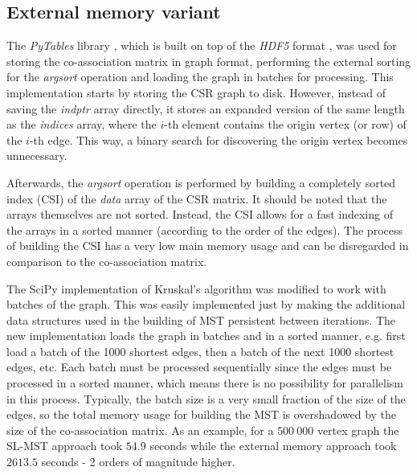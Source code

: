 \subsection{External memory variant} %

\noindent The \emph{PyTables} library \cite{pytables}, which is built on top of the \emph{HDF5} format \cite{hdf5}, was used for storing the co-association matrix in graph format, performing the external sorting for the \emph{argsort} operation and loading the graph in batches for processing.
This implementation starts by storing the CSR graph to disk.
However, instead of saving the \emph{indptr} array directly, it stores an expanded version of the same length as the \emph{indices} array, where the $i$-th element contains the origin vertex (or row) of the $i$-th edge.
This way, a binary search for discovering the origin vertex becomes unnecessary.

Afterwards, the \emph{argsort} operation is performed by building a completely sorted index (CSI) of the \emph{data} array of the CSR matrix. %
It should be noted that the arrays themselves are not sorted.
Instead, the CSI allows for a fast indexing of the arrays in a sorted manner (according to the order of the edges).
The process of building the CSI has a very low main memory usage and can be disregarded in comparison to the co-association matrix.

The SciPy implementation of Kruskal's algorithm was modified to work with batches of the graph.
This was easily implemented just by making the additional data structures used in the building of MST persistent between iterations.
The new implementation loads the graph in batches and in a sorted manner, e.g. first load a batch of the 1000 shortest edges, then a batch of the next 1000 shortest edges, etc.
Each batch must be processed sequentially since the edges must be processed in a sorted manner, which means there is no possibility for parallelism in this process.
Typically, the batch size is a very small fraction of the size of the edges, so the total memory usage for building the MST is overshadowed by the size of the co-association matrix.
As an example, for a $500 \: 000$ vertex graph the SL-MST approach took $54.9$ seconds while the external memory approach took $2613.5$ seconds - 2 orders of magnitude higher.